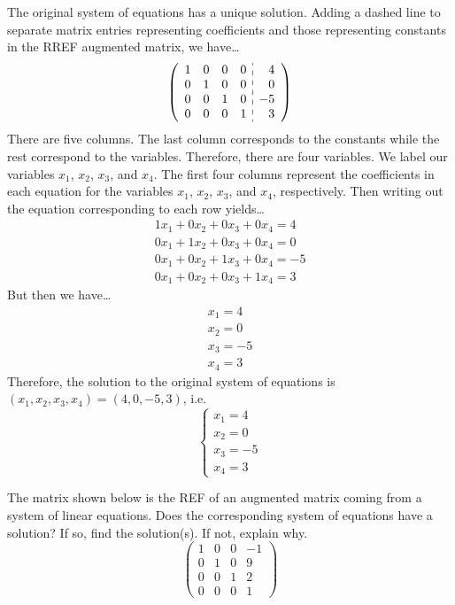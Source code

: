 \documentclass[12pt,letterpaper]{exam}
\begin{document}
\begin{questions}
\sol The original system of equations has a unique solution. Adding a dashed line to separate matrix entries representing coefficients and those representing constants in the RREF augmented matrix, we have\dots
	\[
	\left(
	\begin{array}{rrrr:r}
	1 & 0 & 0 & 0 & 4 \\
	0 & 1 & 0 & 0 & 0 \\
	0 & 0 & 1 & 0 & -5 \\
	0 & 0 & 0 & 1 & 3
	\end{array} 
	\right)
	\]
There are five columns. The last column corresponds to the constants while the rest correspond to the variables. Therefore, there are four variables. We label our variables $x_1$, $x_2$, $x_3$, and $x_4$. The first four columns represent the coefficients in each equation for the variables $x_1$, $x_2$, $x_3$, and $x_4$, respectively. Then writing out the equation corresponding to each row yields\dots
	\[
	\begin{gathered}
	1x_1 + 0x_2 + 0x_3 + 0x_4= 4 \\
	0x_1 + 1x_2 + 0x_3 + 0x_4= 0 \\
	0x_1 + 0x_2 + 1x_3 + 0x_4= -5 \\
	0x_1 + 0x_2 + 0x_3 + 1x_4= 3
	\end{gathered}
	\]
But then we have\dots
	\[
	\begin{gathered}
	x_1= 4 \\
	x_2= 0 \\
	x_3= -5 \\
	x_4= 3
	\end{gathered}
	\]
Therefore, the solution to the original system of equations is $(x_1, x_2, x_3, x_4)= (4, 0, -5, 3)$, i.e.
	\[
	\begin{cases}
	x_1= 4 \\
	x_2= 0 \\
	x_3= -5 \\
	x_4= 3	
	\end{cases}
	\]
 


\newpage
\question[10] The matrix shown below is the REF of an augmented matrix coming from a system of linear equations. Does the corresponding system of equations have a solution? If so, find the solution(s). If not, explain why. 
	\[
	\begin{pmatrix}
	1 & 0 & 0 & -1 \\
	0 & 1 & 0 & 9 \\
	0 & 0 & 1 & 2 \\
	0 & 0 & 0 & 1
	\end{pmatrix}
	\] \pspace


\end{questions}
\end{document}
